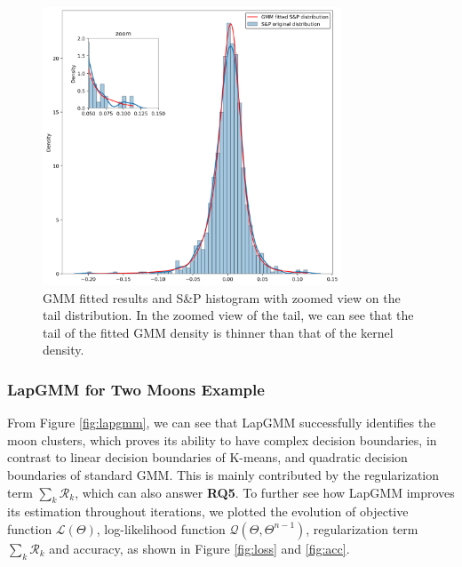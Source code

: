 \documentclass[10pt,journal,compsoc]{IEEEtran}
\begin{document}
     \begin{figure}[h]
        \centering
        \includegraphics[width=3.5in]{figures/hist_GMM.png}
        \caption{GMM fitted results and S\&P histogram with zoomed view on the tail distribution. In the zoomed view of the tail, we can see that the tail of the fitted GMM density is thinner than that of the kernel density. }
        \label{fig:hist_GMM}
    \end{figure}
    
    
    \subsubsection{LapGMM for Two Moons Example}
    From Figure \ref{fig:lapgmm}, we can see that LapGMM successfully identifies the moon clusters, which proves its ability to have complex decision boundaries, in contrast to linear decision boundaries of K-means, and quadratic decision boundaries of standard GMM. This is mainly contributed by the regularization term $\sum_{k}\mathcal{R}_k$, which can also answer \textbf{RQ5}. To further see how LapGMM improves its estimation throughout iterations, we plotted the evolution of objective function $\mathcal{L}(\Theta)$, log-likelihood function $\mathcal{Q}(\Theta, \Theta^{n-1})$, regularization term $\sum_{k}\mathcal{R}_k$ and accuracy, as shown in Figure \ref{fig:loss} and \ref{fig:acc}.
    
\end{document}
